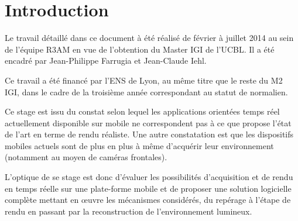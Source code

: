 \documentclass[10pt,a4paper,twoside, twocolumn]{report}
\newcommand*{\rootPath}{../}
\begin{document}
\chapter{Introduction}

Le travail détaillé dans ce document à été réalisé de février à juillet 2014 au sein de l'équipe R3AM en vue de l’obtention du Master IGI de l'UCBL. Il a été encadré par Jean-Philippe Farrugia et Jean-Claude Iehl.

Ce travail a été financé par l'ENS de Lyon, au même titre que le reste du M2 IGI, dans le cadre de la troisième année correspondant au statut de normalien.

Ce stage est issu du constat selon lequel les applications orientées temps réel actuellement disponible sur mobile ne correspondent pas à ce que propose l'état de l'art en terme de rendu réaliste. Une autre constatation est que les dispositifs mobiles actuels sont de plus en plus à même d’acquérir leur environnement (notamment au moyen de caméras frontales).

L'optique de se stage est donc d'évaluer les possibilités d'acquisition et de rendu en temps réelle sur une plate-forme mobile et de proposer une solution logicielle complète mettant en œuvre les mécanismes considérés, du repérage à l'étape de rendu en passant par la reconstruction de l'environnement lumineux.

\ifstandalone
	
	
\fi
\end{document}
